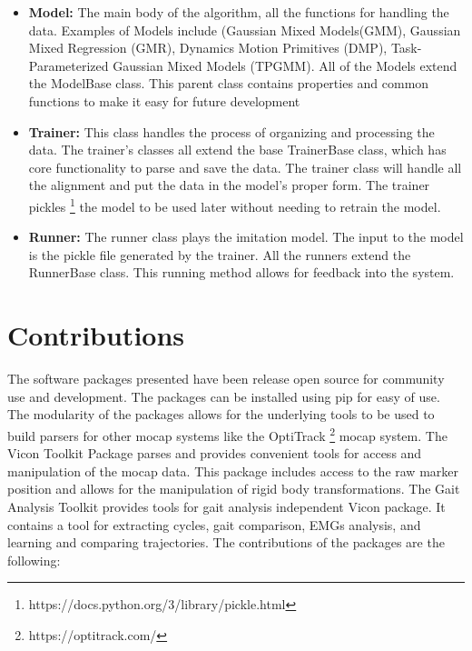 \begin{itemize}[noitemsep]
    \item \textbf{Model:} The main body of the algorithm, all the functions for handling the data. Examples of Models include (Gaussian Mixed Models(GMM), Gaussian Mixed Regression (GMR), Dynamics Motion Primitives (DMP), Task-Parameterized Gaussian Mixed Models (TPGMM). All of the Models extend the ModelBase class. This parent class contains properties and common functions to make it easy for future development
    \item \textbf{Trainer:} This class handles the process of organizing and processing the data. The trainer's classes all extend the base TrainerBase class, which has core functionality to parse and save the data. The trainer class will handle all the alignment and put the data in the model's proper form. The trainer pickles \footnote{https://docs.python.org/3/library/pickle.html} the model to be used later without needing to retrain the model. 
    \item \textbf{Runner:} The runner class plays the imitation model. The input to the model is the pickle file generated by the trainer. All the runners extend the RunnerBase class. This running method allows for feedback into the system. 
\end{itemize}


\section{Contributions}

The software packages presented have been release open source for community use and development. The packages can be installed using pip for easy of use. The modularity of the packages allows for the underlying tools to be used to build parsers for other mocap systems like the OptiTrack \footnote{https://optitrack.com/} mocap system. The Vicon Toolkit Package parses and provides convenient tools for access and manipulation of the mocap data. This package includes access to the raw marker position and allows for the manipulation of rigid body transformations. The Gait Analysis Toolkit provides tools for gait analysis independent Vicon package.  It contains a tool for extracting cycles, gait comparison, EMGs analysis, and learning and comparing trajectories. The contributions of the packages are the following:

